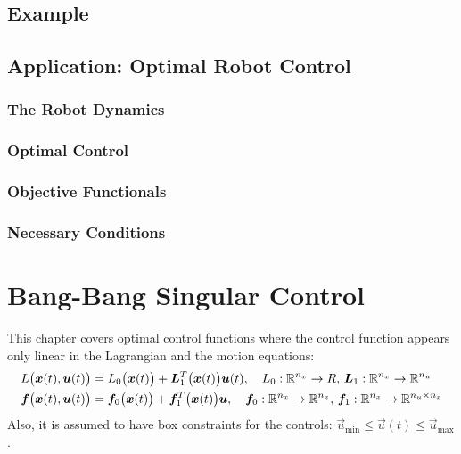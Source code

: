 		\subsection{Example} %

		\subsection{Application: Optimal Robot Control} %

			\subsubsection{The Robot Dynamics} %

			\subsubsection{Optimal Control} %

			\subsubsection{Objective Functionals} %

			\subsubsection{Necessary Conditions} %

	\section{Bang-Bang Singular Control}
		This chapter covers optimal control functions where the control function appears only linear in the Lagrangian and the motion equations:
		\begin{align*}
			L\big(\bm{x}(t), \bm{u}(t)\big) &= L_0\big(\bm{x}(t)\big) + \bm{L}_1^T\big(\bm{x}(t)\big) \bm{u}(t),\quad L_0 : \mathbb{R}^{n_x} \to R,\, \bm{L}_1 : \mathbb{R}^{n_x} \to \mathbb{R}^{n_u} \\
			\bm{f}\big(\bm{x}(t), \bm{u}(t)\big) &= \bm{f}_0\big(\bm{x}(t)\big) + \bm{f}_1^T\big(\bm{x}(t)\big) \bm{u},\quad \bm{f}_0 : \mathbb{R}^{n_x} \to \mathbb{R}^{n_x},\, \bm{f}_1 : \mathbb{R}^{n_x} \to \mathbb{R}^{n_u \times n_x}
		\end{align*}
		Also, it is assumed to have box constraints for the controls: \( \vec{u}_\mathrm{min} \leq \vec{u}(t) \leq \vec{u}_\mathrm{max} \).

